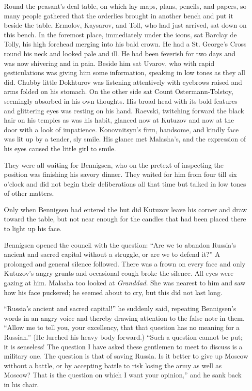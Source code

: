 Round the peasant's deal table, on which lay maps, plans,
pencils, and papers, so many people gathered that the orderlies
brought in another bench and put it beside the table. Ermolov,
Kaysarov, and Toll, who had just arrived, sat down on this
bench. In the foremost place, immediately under the icons, sat
Barclay de Tolly, his high forehead merging into his bald
crown. He had a St. George's Cross round his neck and looked pale
and ill. He had been feverish for two days and was now shivering
and in pain. Beside him sat Uvarov, who with rapid gesticulations
was giving him some information, speaking in low tones as they
all did.  Chubby little Dokhturov was listening attentively with
eyebrows raised and arms folded on his stomach. On the other side
sat Count Ostermann-Tolstoy, seemingly absorbed in his own
thoughts. His broad head with its bold features and glittering
eyes was resting on his hand. Raevski, twitching forward the
black hair on his temples as was his habit, glanced now at
Kutuzov and now at the door with a look of impatience.
Konovnitsyn's firm, handsome, and kindly face was lit up by a
tender, sly smile. His glance met Malasha's, and the expression
of his eyes caused the little girl to smile.

They were all waiting for Bennigsen, who on the pretext of
inspecting the position was finishing his savory dinner. They
waited for him from four till six o'clock and did not begin their
deliberations all that time but talked in low tones of other
matters.

Only when Bennigsen had entered the hut did Kutuzov leave his
corner and draw toward the table, but not near enough for the
candles that had been placed there to light up his face.

Bennigsen opened the council with the question: ``Are we to
abandon Russia's ancient and sacred capital without a struggle,
or are we to defend it?'' A prolonged and general silence
followed. There was a frown on every face and only Kutuzov's
angry grunts and occasional cough broke the silence. All eyes
were gazing at him. Malasha too looked at \emph{Granddad}. She
was nearest to him and saw how his face puckered; he seemed about
to cry, but this did not last long.

``Russia's ancient and sacred capital!'' he suddenly said,
repeating Bennigsen's words in an angry voice and thereby drawing
attention to the false note in them. ``Allow me to tell you, your
excellency, that that question has no meaning for a Russian.''
(He lurched his heavy body forward.) ``Such a question cannot be
put; it is senseless! The question I have asked these gentlemen
to meet to discuss is a military one. The question is that of
saving Russia. Is it better to give up Moscow without a battle,
or by accepting battle to risk losing the army as well as Moscow?
That is the question on which I want your opinion,'' and he sank
back in his chair.

